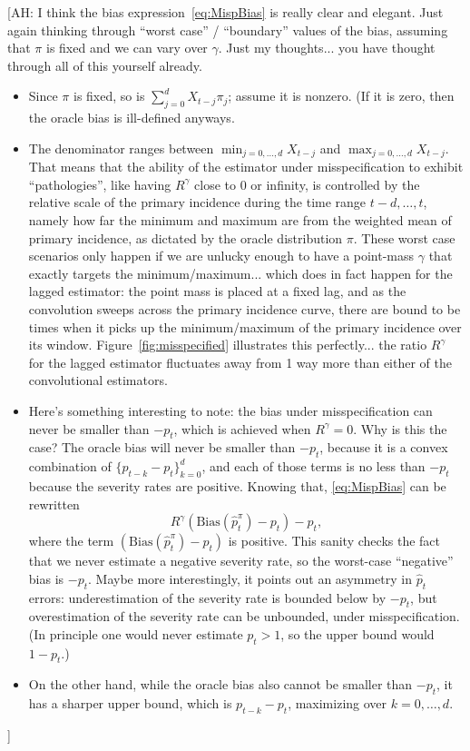 \documentclass{article}
\newcommand{\ahcomment}[1]{{\color{red}[AH: #1]}}
\begin{document}
\ahcomment{
  I think the bias expression~\eqref{eq:MispBias} is really clear and
  elegant.  Just again thinking through ``worst case'' / ``boundary'' values
  of the bias, assuming that $\pi$ is fixed and we can vary over $\gamma$.
  Just my thoughts... you have thought through all of this yourself already.

  \begin{itemize}
    \item Since $\pi$ is fixed, so is $\sum_{j=0}^{d} X_{t-j}\pi_j$; assume
      it is nonzero.  (If it is zero, then the oracle bias is ill-defined
      anyways.
    \item The denominator ranges between $\min_{j=0,\dotsc,d} X_{t-j}$ and 
      $\max_{j=0,\dotsc,d} X_{t-j}$.  That means that the ability of the
      estimator under misspecification to exhibit ``pathologies'', like having
      $R^\gamma$ close to 0 or infinity, is controlled by the relative scale
      of the primary incidence during the time range $t-d, \dotsc, t$, namely
      how far the minimum and maximum are from the weighted mean of primary
      incidence, as dictated by the oracle distribution $\pi$.  These
      worst case scenarios only happen if we are unlucky enough to have
      a point-mass $\gamma$ that exactly targets the minimum/maximum... which
      does in fact happen for the lagged estimator: the point mass is
      placed at a fixed lag, and as the convolution sweeps across the
      primary incidence curve, there are bound to be times when it picks
      up the minimum/maximum of the primary incidence over its window. 
      Figure~\ref{fig:misspecified} illustrates this perfectly... the ratio
      $R^\gamma$ for the lagged estimator fluctuates away from 1 way more
      than either of the convolutional estimators.
    \item Here's something interesting to note: the bias under misspecification
      can never be smaller than $-p_t$, which is achieved when $R^\gamma=0$.
      Why is this the case?  The oracle bias will never be smaller than
      $-p_t$, because it is a convex combination of $\{p_{t-k}-p_t\}_{k=0}^d$,
      and each of those terms is no less than $-p_t$ because the severity
      rates are positive.  Knowing that, \eqref{eq:MispBias} can be rewritten
      \begin{equation*}
        R^\gamma (\text{Bias}(\hat{p}_t^\pi) - p_t) - p_t,
      \end{equation*}
      where the term $(\text{Bias}(\hat{p}_t^\pi) - p_t)$ is positive.  This
      sanity checks the fact that we never estimate a negative severity rate,
      so the worst-case ``negative'' bias is $-p_t$.  Maybe more interestingly,
      it points out an asymmetry in $\hat p_t$ errors: underestimation of the
      severity rate is bounded below by $-p_t$, but overestimation of the
      severity rate can be unbounded, under misspecification.  (In principle
      one would never estimate $p_t > 1$, so the upper bound would $1-p_t$.)
    \item On the other hand, while the oracle bias also cannot be smaller
      than $-p_t$, it has a sharper upper bound, which is $p_{t-k}-p_t$,
      maximizing over $k=0,\dotsc,d$.
  \end{itemize}
}
\end{document}
